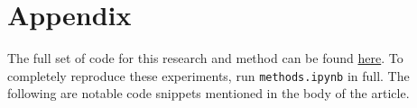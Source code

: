 \chapter{Appendix}
\label{Appendix}

The full set of code for this research and method can be found \href{https://github.com/hangulu/thesis}{here}. To completely reproduce these experiments, run \texttt{methods.ipynb} in full. The following are notable code snippets mentioned in the body of the article.




